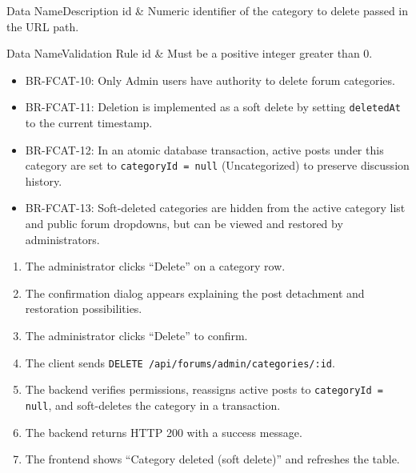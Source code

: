
\begin{specdatatable}{Data Name}{Description}
id & Numeric identifier of the category to delete passed in the URL path.\\ \hline
\end{specdatatable}

\begin{specdatatable}{Data Name}{Validation Rule}
id & Must be a positive integer greater than 0.\\ \hline
\end{specdatatable}

\begin{itemize}[leftmargin=1.6em,topsep=3pt,itemsep=2pt,parsep=0pt,label=$\bullet$]\brrulelist
    \item BR-FCAT-10: Only Admin users have authority to delete forum categories.
    \item BR-FCAT-11: Deletion is implemented as a soft delete by setting \texttt{deletedAt} to the current timestamp.
    \item BR-FCAT-12: In an atomic database transaction, active posts under this category are set to \texttt{categoryId = null} (Uncategorized) to preserve discussion history.
    \item BR-FCAT-13: Soft-deleted categories are hidden from the active category list and public forum dropdowns, but can be viewed and restored by administrators.
\end{itemize}

\begin{enumerate}[leftmargin=1.6em,topsep=3pt,itemsep=2pt,parsep=0pt]
    \item The administrator clicks ``Delete'' on a category row.
    \item The confirmation dialog appears explaining the post detachment and restoration possibilities.
    \item The administrator clicks ``Delete'' to confirm.
    \item The client sends \texttt{DELETE /api/forums/admin/categories/:id}.
    \item The backend verifies permissions, reassigns active posts to \texttt{categoryId = null}, and soft-deletes the category in a transaction.
    \item The backend returns HTTP 200 with a success message.
    \item The frontend shows ``Category deleted (soft delete)'' and refreshes the table.
\end{enumerate}

